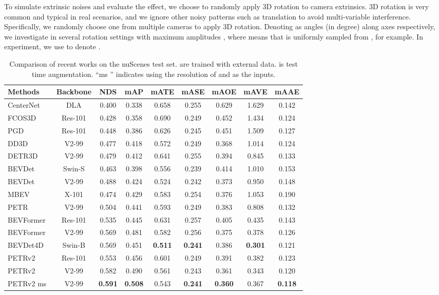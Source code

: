 \documentclass[10pt,twocolumn,letterpaper]{article}
\begin{document}
To simulate extrinsic noises and evaluate the effect, we choose to randomly apply 3D rotation to camera extrinsics. 3D rotation is very common and typical in real scenarios, and we ignore other noisy patterns such as translation to avoid multi-variable interference.
Specifically, we randomly choose one from multiple cameras to apply 3D rotation. Denoting  as angles (in degree) along  axes respectively, we investigate in several rotation settings with maximum amplitudes , where  means that  is uniformly sampled from , for example. In experiment, we use  to denote . 


\begin{table*}[t!]
\begin{center}
\caption{Comparison of recent works on the nuScenes test set.  are trained with external data.   is test time augmentation. “ms ” indicates using the resolution of  and  as the inputs.}
\label{table:2}
\setlength{\tabcolsep}{5pt}
\begin{tabular}{l|c|ccccccc}
\hline
Methods & Backbone & NDS & mAP & mATE & mASE & mAOE & mAVE & mAAE \\

\hline
CenterNet~\cite{zhou2019objects} & DLA &0.400 &0.338 &0.658 &0.255 &0.629 &1.629 &0.142  \\
 FCOS3D~\cite{wang2021fcos3d} & Res-101 &0.428 &0.358 &0.690 &0.249 &0.452 &1.434 &0.124  \\
 PGD~\cite{wang2022pgd} & Res-101 &0.448 &0.386 &0.626 &0.245 &0.451 &1.509 &0.127  \\
 DD3D~\cite{park2021dd3d} & V2-99 &0.477 &0.418  &0.572 &0.249 &0.368 &1.014 &0.124  \\
 DETR3D~\cite{wang2022detr3d} & V2-99 &0.479 &0.412  &0.641 &0.255 &0.394 &0.845 &0.133  \\
 BEVDet~\cite{huang2021bevdet} & Swin-S &0.463 &0.398 &0.556 &0.239 &0.414 &1.010 &0.153  \\
 BEVDet~\cite{huang2021bevdet} & V2-99 &0.488 &0.424 &0.524 &0.242 &0.373 &0.950 &0.148  \\
 MBEV~\cite{xie2022m} & X-101&0.474 &0.429 &0.583 &0.254 & 0.376 &1.053 &0.190 \\
 PETR~\cite{liu2022petr} & V2-99 &0.504 &0.441 &0.593 &0.249 &0.383 &0.808 &0.132  \\
\hline
BEVFormer~\cite{li2022bevformer} & Res-101 &0.535 &0.445 &0.631 &0.257 &0.405 &0.435 &0.143  \\
BEVFormer~\cite{li2022bevformer} & V2-99 &0.569 &0.481 &0.582 &0.256 &0.375 &0.378 &0.126  \\
BEVDet4D~\cite{huang2022bevdet4d} & Swin-B &0.569 &0.451 &\textbf{0.511} &\textbf{0.241} &0.386 &\textbf{0.301} &0.121  \\
PETRv2 & Res-101 &0.553 &0.456 &0.601 &0.249 &0.391 &0.382 &0.123  \\
PETRv2 & V2-99 &0.582 &0.490 &0.561 &0.243 &0.361 &0.343 &0.120  \\
PETRv2 ms & V2-99 &\textbf{0.591} &\textbf{0.508} &0.543 &\textbf{0.241} &\textbf{0.360} &0.367 &\textbf{0.118}  \\


\end{tabular}
\end{center}
\end{table*}
\end{document}
